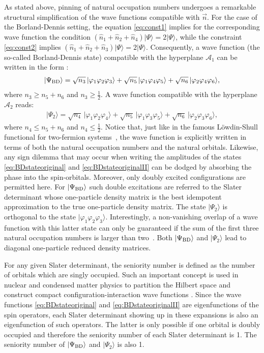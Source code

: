 \documentclass[aps,twocolumn,showpacs,pra,superscriptaddress,floatfix,longbibliography]{revtex4-1}
\newcommand{\7}{\dagger}
\newcommand{\ket}[1]{\mbox{$| #1 \rangle$}}
\begin{document}
As stated above, pinning of natural occupation numbers 
undergoes a remarkable structural simplification of the
wave functions compatible with $\vec{n}$. 
For the case of the Borland-Dennis setting,
the equation \eqref{eq:const1} implies for the corresponding
wave function the condition
$(\hat{n}_{1} + \hat{n}_{2} + \hat{n}_{4})\ket{\Psi} = 2 \ket{\Psi}$, 
while the constraint \eqref{eq:const2} implies
$(\hat{n}_{1} + \hat{n}_{2} + \hat{n}_{3})\ket{\Psi} = 2 \ket{\Psi}$.
Consequently, a wave function (the so-called Borland-Dennis state)
compatible with the hyperplane 
$\mathcal{A}_1$ can be written in the form \cite{BenavQuasi2}:
\begin{align}
\label{eq:BDstateoriginal}
\ket{\Psi_{\rm BD}} = \sqrt{n_3} \, \ket{\varphi_1\varphi_2\varphi_3} + \sqrt{n_5} \,
\ket{\varphi_1\varphi_4\varphi_5} + \sqrt{n_6} \, \ket{\varphi_2\varphi_4\varphi_6},
\end{align}
where $n_{3} \geq n_{5} + n_{6}$ and $n_{3} \geq \tfrac12$.
A wave function 
compatible with the hyperplane $\mathcal{A}_2$ reads:
\begin{align}
\label{eq:BDstateoriginalII}
\ket{\Psi_2} = \sqrt{n_4} \, \ket{\varphi_1\varphi_2\varphi_4} + \sqrt{n_5} \,
\ket{\varphi_1\varphi_3\varphi_5} + \sqrt{n_6} \, \ket{\varphi_2\varphi_3\varphi_6},
\end{align} 
where $n_{4} \leq n_{5} + n_{6}$ and $n_{4} \leq \tfrac12$.
Notice that, just like in the famous L\"owdin-Shull functional for 
two-fermion systems~\cite{LS}, the wave function is 
explicitly written in terms of both the natural occupation 
numbers and the natural orbitals. Likewise, any sign dilemma 
that may occur when writing the amplitudes of the states
\eqref{eq:BDstateoriginal} and \eqref{eq:BDstateoriginalII}
can be dodged by absorbing the phase into the spin-orbitals.
Moreover, only doubly excited configurations are 
permitted here.  For  $\ket{\Psi_{\rm BD}}$ such double 
excitations are referred to the Slater determinant whose 
one-particle density matrix is the best idempotent 
approximation to the true one-particle density matrix.
The state $\ket{\Psi_2}$ is orthogonal to  the state
$\ket{\varphi_1\varphi_2\varphi_3}$. Interestingly, a
non-vanishing overlap of a wave function with this 
latter state can only be guaranteed if the sum of the 
first three natural occupation numbers 
is larger than two~\cite{KS68}.  Both $\ket{\Psi_{\rm BD}}$ 
and $\ket{\Psi_2}$ lead to diagonal one-particle reduced 
density matrices.
 
 For any given Slater determinant, the seniority number
 is defined as the number of orbitals which are singly occupied. 
 Such an important concept is used in nuclear and condensed
 matter physics to partition the Hilbert space and construct 
 compact configuration-interaction wave functions
 \cite{Seniority,SeniorityI}. Since the wave functions 
 \eqref{eq:BDstateoriginal} and \eqref{eq:BDstateoriginalII}
 are eigenfunctions of the spin operators, each Slater determinant
 showing up in these expansions is also an eigenfunction of 
 such operators. The latter is only possible if one orbital is 
 doubly occupied and therefore the seniority number of each 
 Slater determinant is 1. The seniority number of 
 $\ket{\Psi_{\rm BD}}$ and $\ket{\Psi_2}$ is also 1. 
\end{document}
